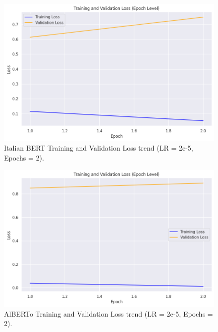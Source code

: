 \begin{figure}
    \includegraphics[width=\columnwidth]{../../results/images/bert_base_losses_2epochs.png}
    \caption{Italian BERT Training and Validation Loss trend (LR = 2e-5, Epochs = 2).}
    \label{fig:bert_base_losses}
\end{figure}

\begin{figure}
    \includegraphics[width=\columnwidth]{../../results/images/alberto_losses_2epochs.png}
    \caption{AlBERTo Training and Validation Loss trend (LR = 2e-5, Epochs = 2).}
    \label{fig:alberto_losses}
\end{figure}